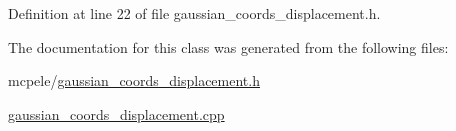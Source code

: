 \-Definition at line 22 of file gaussian\-\_\-coords\-\_\-displacement.\-h.



\-The documentation for this class was generated from the following files\-:\begin{DoxyCompactItemize}
\item 
mcpele/\hyperlink{gaussian__coords__displacement_8h}{gaussian\-\_\-coords\-\_\-displacement.\-h}\item 
\hyperlink{gaussian__coords__displacement_8cpp}{gaussian\-\_\-coords\-\_\-displacement.\-cpp}\end{DoxyCompactItemize}
